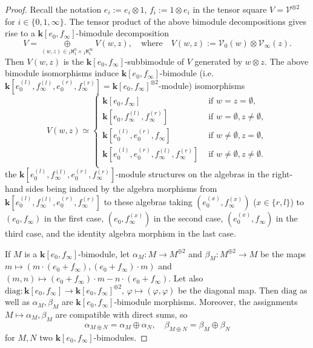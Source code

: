 \documentclass[10pt,a4paper]{amsart}
\begin{document}
\begin{proof}
Recall the notation $e_i:=e_i\otimes1$, $f_i:=1\otimes e_i$ in the tensor square $V=\mathcal V^{\otimes2}$ for
$i\in\{0,1,\infty\}$. The tensor product of the above bimodule decompositions gives rise to a
$\mathbf k[e_0,f_\infty]$-bimodule decomposition 
\begin{equation}\label{direct;sum:V:0705}
V=\underset{(w,z)\in{} {}_{1}{\mathtt M}^0_{1}\times {}_{1}{\mathtt M}^\infty_{1}
}{\oplus}{V({w,z})}, \quad \mathrm{where}\quad 
{V}(w,z):=\mathcal V_0(w)\otimes\mathcal V_\infty(z).
\end{equation}
Then $V(w,z)$ is the $\mathbf k [e_0,f_\infty]$-subbimodule of $V$ generated by $w\otimes z$. 
The above bimodule isomorphisms induce  $\mathbf k [e_0,f_\infty]$-bimodule (i.e. $\mathbf k [e_0^{(l)},f_\infty^{(l)},e_0^{(r)},f_\infty^{(r)}]=\mathbf k [e_0,f_\infty]^{\otimes2}$-module) isomorphisms
\begin{equation}\label{case:240508:1833}
    {V}(w,z)\simeq
\begin{cases}
 \mathbf k[e_0,f_\infty] & \text{ if } w=z=\emptyset, \\ 
  \mathbf k[e_0,f_\infty^{(l)},f_\infty^{(r)}] &  \text{ if }  w=\emptyset, z\neq \emptyset,\\ 
  \mathbf k[e_0^{(l)},e_0^{(r)},f_\infty] & \text{ if }  w\neq\emptyset, z=\emptyset, \\ 
  \mathbf k[e_0^{(l)},e_0^{(r)},f_\infty^{(l)},f_\infty^{(r)}] & \text{ if }  w\neq\emptyset, z\neq\emptyset. \\ 
\end{cases}
\end{equation}
the $\mathbf k [e_0^{(l)},f_\infty^{(l)},e_0^{(r)},f_\infty^{(r)}]$-module structures on the algebras in the right-hand sides being 
induced by the algebra morphisms from  $\mathbf k [e_0^{(l)},f_\infty^{(l)},e_0^{(r)},f_\infty^{(r)}]$ to these algebras 
taking $(e_0^{(x)},f_\infty^{(x)})$ ($x\in\{r,l\}$) to $(e_0,f_\infty)$ in the first case, $(e_0,f_\infty^{(x)})$ in the second 
case, $(e_0^{(x)},f_\infty)$ in the third case,  and the identity algebra morphism in the last case. 

If $M$ is a $\mathbf k[e_0,f_\infty]$-bimodule, let $\alpha_M : M\to M^{\oplus 2}$ and 
$\beta_M : M^{\oplus 2}\to M$ be the maps $m\mapsto (m\cdot(e_0+f_\infty),(e_0+f_\infty)\cdot m)$
and $(m,n)\mapsto (e_0+f_\infty)\cdot m-n\cdot(e_0+f_\infty)$. Let also 
$\mathrm{diag} : \mathbf k[e_0,f_\infty]\to\mathbf k[e_0,f_\infty]^{\oplus2}$, $\varphi\mapsto 
(\varphi,\varphi)$ be the diagonal map. Then $\mathrm{diag}$ as well as $\alpha_M,\beta_M$ are 
$\mathbf k[e_0,f_\infty]$-bimodule morphisms. Moreover, the assignments $M\mapsto\alpha_M,\beta_M$ are 
compatible with direct sums, so 
\begin{equation}\label{direct:sums}
\alpha_{M\oplus N}=\alpha_M\oplus\alpha_N, \quad \beta_{M\oplus N}=\beta_M\oplus\beta_N
\end{equation}
for $M,N$ two $\mathbf k[e_0,f_\infty]$-bimodules. 


\end{proof}
\end{document}
